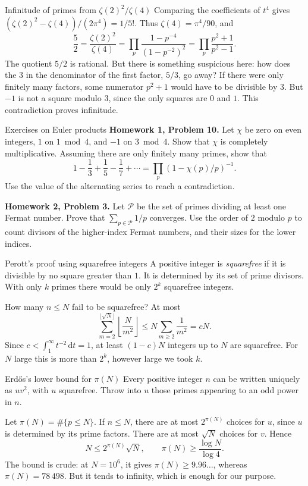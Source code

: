 \documentclass[aspectratio=169,11pt]{beamer}
\newcommand{\dd}{\,\mathrm d}
\newcommand{\HW}[2]{{\color{teal}\textbf{Homework #1, Problem #2.}}}
\begin{document}
\begin{frame}{Infinitude of primes from $\zeta(2)^2/\zeta(4)$}
Comparing the coefficients of $t^4$ gives $(\zeta(2)^2-\zeta(4))/(2\pi^4)=1/5!$. Thus $\zeta(4)=\pi^4/90$, and
\[\frac52=\frac{\zeta(2)^2}{\zeta(4)}=\prod_p\frac{1-p^{-4}}{(1-p^{-2})^2}=\prod_p\frac{p^2+1}{p^2-1}.\]
The quotient $5/2$ is rational. But there is something suspicious here: how does the $3$ in the denominator of the first factor, $5/3$, go away? If there were only finitely many factors, some numerator $p^2+1$ would have to be divisible by $3$. But $-1$ is not a square modulo $3$, since the only squares are $0$ and $1$. This contradiction proves infinitude.
\end{frame}
\begin{frame}{Exercises on Euler products}
\HW{1}{10} Let $\chi$ be zero on even integers, $1$ on $1\bmod4$, and $-1$ on $3\bmod4$. Show that $\chi$ is completely multiplicative. Assuming there are only finitely many primes, show that
\[1-\frac13+\frac15-\frac17+\cdots=\prod_p(1-\chi(p)/p)^{-1}.\]
Use the value of the alternating series to reach a contradiction.

\HW{2}{3} Let $\mathcal P$ be the set of primes dividing at least one Fermat number. Prove that $\sum_{p\in\mathcal P}1/p$ converges. Use the order of $2$ modulo $p$ to count divisors of the higher-index Fermat numbers, and their sizes for the lower indices.
\end{frame}
\begin{frame}{Perott's proof using squarefree integers}
A positive integer is \emph{squarefree} if it is divisible by no square greater than $1$. It is determined by its set of prime divisors. With only $k$ primes there would be only $2^k$ squarefree integers.

How many $n\le N$ fail to be squarefree? At most
\[\sum_{m=2}^{\lfloor\sqrt N\rfloor}\left\lfloor\frac N{m^2}\right\rfloor\le N\sum_{m\ge2}\frac1{m^2}=cN.\]
Since $c<\int_1^\infty t^{-2}\dd t=1$, at least $(1-c)N$ integers up to $N$ are squarefree. For $N$ large this is more than $2^k$, however large we took $k$.
\end{frame}
\begin{frame}{Erd\H{o}s's lower bound for $\pi(N)$}
Every positive integer $n$ can be written uniquely as $uv^2$, with $u$ squarefree. Throw into $u$ those primes appearing to an odd power in $n$.

Let $\pi(N)=\#\{p\le N\}$. If $n\le N$, there are at most $2^{\pi(N)}$ choices for $u$, since $u$ is determined by its prime factors. There are at most $\sqrt N$ choices for $v$. Hence
\[N\le2^{\pi(N)}\sqrt N,\qquad \pi(N)\ge\frac{\log N}{\log4}.\]
The bound is crude: at $N=10^6$, it gives $\pi(N)\ge9.96\ldots$, whereas $\pi(N)=78\,498$. But it tends to infinity, which is enough for our purpose.
\end{frame}
\end{document}
